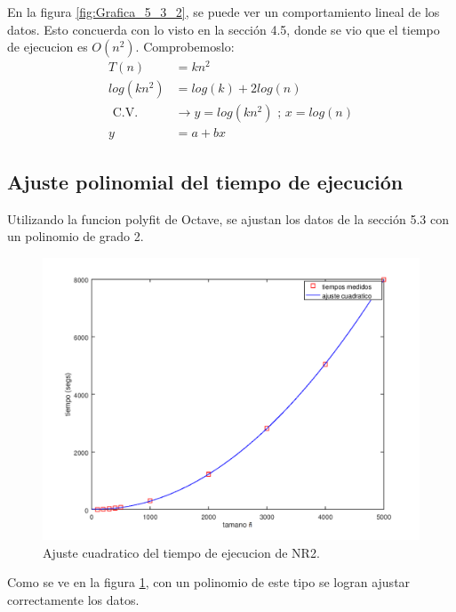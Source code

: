 \documentclass{endm}
\begin{document}
En la figura \ref{fig:Grafica_5_3_2}, se puede ver un comportamiento lineal de los datos.
Esto concuerda con lo visto en la sección 4.5, donde se vio que el tiempo de ejecucion es $O(n^2)$.
Comprobemoslo:
\begin{align}
    T(n) &= kn^2 \\
    log(kn^2) &= log(k) + 2log(n) \\
    \text{ C.V.}& \rightarrow y = log(kn^2) \text{ ; } x = log(n) \\
    y &= a + bx
\end{align}

\subsection{Ajuste polinomial del tiempo de ejecución}
Utilizando la funcion polyfit de Octave, se ajustan los datos de la sección 5.3 con un polinomio de grado 2.
\begin{figure}[h!]
    \includegraphics[width=\linewidth]{Grafica_5_4.png}
    \caption{Ajuste cuadratico del tiempo de ejecucion de NR2.}
    \label{fig:Grafica_5_4}
\end{figure}
Como se ve en la figura \ref{fig:Grafica_5_4}, con un polinomio de este tipo se logran ajustar correctamente los datos.
\clearpage
\printbibliography
\end{document}
